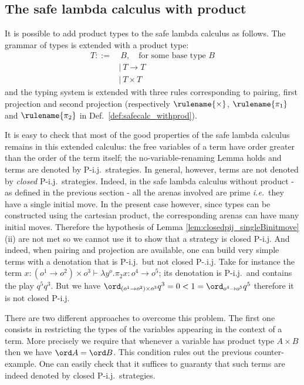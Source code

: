 \subsection{The safe lambda calculus with product}
It is possible to add product types to the safe lambda calculus as
follows. The grammar of types is extended with a product type:
\begin{align*}
T ::=& \ B,  \quad \mbox{for some base type $B$} \\
   &| \ T \rightarrow T \\
   &| \ T \times T
\end{align*}
and the typing system is extended with three rules corresponding to
pairing, first projection and second projection (respectively
$\rulename{\times}$, $\rulename{\pi_1}$ and $\rulename{\pi_2}$ in
Def.\ \ref{def:safecalc_withprod}).

It is easy to check that most of the good properties of the safe
lambda calculus remains in this extended calculus: the free
variables of a term have order greater than the order of the term
itself; the no-variable-renaming Lemma holds and terms are denoted
by P-i.j.\ strategies. In general, however, terms are not denoted by
\emph{closed} P-i.j.\ strategies. Indeed, in the safe lambda
calculus without product - as defined in the previous section - all
the arenas involved are prime {\it i.e.}~they have a single initial
move. In the present case however, since types can be constructed
using the cartesian product, the corresponding arenas can have many
initial moves. Therefore the hypothesis of Lemma
\ref{lem:closedpij_singleBinitmove}(ii) are not met so we cannot use it to show that a strategy is closed P-i.j. And indeed, when pairing and projection are available, one can build very simple terms with a denotation that is P-i.j.\ but not closed P-.i.j. Take for instance the term $x : (o^1\rightarrow o^2)\times o^3 \vdash \lambda y^o . \pi_2 x : o^4 \rightarrow o^5$; its denotation is P-i.j.\ and contains the play $q^5 q^3$. But we have $\ord_{(o^1\rightarrow o^2)\times o^3} q^3 = 0 < 1 = \ord_{o^4
\rightarrow o^5} q^5$ therefore it is not closed P-i.j.


There are two different approaches to overcome this problem. The
first one consists in restricting the types of the variables
appearing in the context of a term. More precisely we require that
whenever a variable has product type $A \times B$ then we have $\ord
A = \ord B$. This condition rules out the previous counter-example.
One can easily check that it suffices to guaranty that such terms
are indeed denoted by closed P-i.j.\ strategies.

